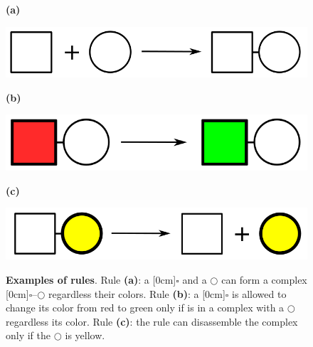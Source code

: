 \documentclass[12pt]{fithesis2}
\begin{document}
\begin{figure}[!h]
\begin{center}
\begin{minipage}[l]{0.1\textwidth}
    \textbf{(a)}
  \end{minipage}
  \begin{minipage}[r]{0.6\textwidth}
    {\hspace*{0.8cm}\includegraphics[scale=0.2]{pics/rule_complex}}
\end{minipage}

\begin{minipage}[l]{0.1\textwidth}
    \textbf{(b)}
  \end{minipage}
  \begin{minipage}[r]{0.6\textwidth}
    {\hspace*{1.35cm}\includegraphics[scale=0.2]{pics/rule_change}}
\end{minipage}

\begin{minipage}[l]{0.1\textwidth}
    \textbf{(c)}
  \end{minipage}
  \begin{minipage}[r]{0.6\textwidth}
    {\hspace*{1.3cm}\includegraphics[scale=0.2]{pics/rule_diss}}
\end{minipage}
\caption{\textbf{Examples of rules}. Rule \textbf{(a)}: a \raisebox{-0.02cm}[0cm]{{\large $\square$}} and a $\bigcirc$ can form a complex \raisebox{-0.02cm}[0cm]{{\large $\square$}}--$\bigcirc$ regardless their colors. Rule \textbf{(b)}: a \raisebox{-0.02cm}[0cm]{{\large $\square$}} is allowed to change its color from red to green only if is in a complex with a $\bigcirc$ regardless its color. Rule \textbf{(c)}: the rule can disassemble the complex only if the $\bigcirc$ is yellow.}
\label{rules:fig}
\end{center}
\end{figure}
\end{document}
